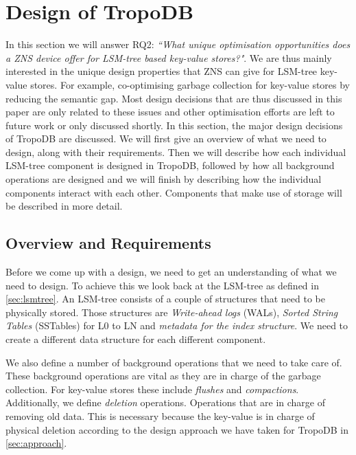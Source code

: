\chapter{Design of TropoDB}
\label{sec:design}
In this section we will answer RQ2: \textit{``What unique optimisation opportunities does a ZNS device offer for LSM-tree based key-value stores?"}.
We are thus mainly interested in the unique design properties that ZNS can give for LSM-tree key-value stores. For example, co-optimising garbage collection for key-value stores by reducing the semantic gap. Most design decisions that are thus discussed in this paper are only related to these issues and other optimisation efforts are left to future work or only discussed shortly. In this section, the major design decisions of TropoDB are discussed. We will first give an overview of what we need to design, along with their requirements. Then we will describe how each individual LSM-tree component is designed in TropoDB, followed by how all background operations are designed and we will finish by describing how the individual components interact with each other. Components that make use of storage will be described in more detail.

\section{Overview and Requirements}
Before we come up with a design, we need to get an understanding of what we need to design. To achieve this we look back at the LSM-tree as defined in \autoref{sec:lsmtree}. An LSM-tree consists of a couple of structures that need to be physically stored. Those structures are \textit{Write-ahead logs} (WALs), \textit{Sorted String Tables} (SSTables) for L0 to LN and \textit{metadata for the index structure}. We need to create a different data structure for each different component. 

We also define a number of background operations that we need to take care of. These background operations are vital as they are in charge of the garbage collection. For key-value stores these include \textit{flushes} and \textit{compactions}. Additionally, we define \textit{deletion} operations. Operations that are in charge of removing old data. This is necessary because the key-value is in charge of physical deletion according to the design approach we have taken for TropoDB in \autoref{sec:approach}.

